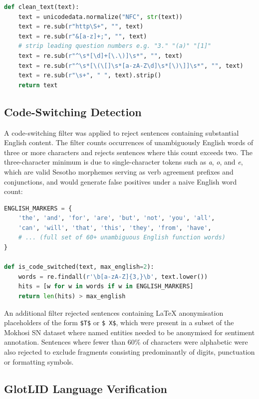 \documentclass[12pt]{ThesisRU}
\begin{document}
\begin{lstlisting}[language=Python, caption={Text cleaning function.}, label={lst:clean}]
def clean_text(text):
    text = unicodedata.normalize("NFC", str(text))
    text = re.sub(r"http\S+", "", text)
    text = re.sub(r"&[a-z]+;", "", text)
    # strip leading question numbers e.g. "3." "(a)" "[1]"
    text = re.sub(r"^\s*[\d]+[\.\)]\s*", "", text)
    text = re.sub(r"^\s*[\(\[]\s*[a-zA-Z\d]\s*[\)\]]\s*", "", text)
    text = re.sub(r"\s+", " ", text).strip()
    return text
\end{lstlisting}

\subsection{Code-Switching Detection}

A code-switching filter was applied to reject sentences containing substantial English content. The filter counts occurrences of unambiguously English words of three or more characters and rejects sentences where this count exceeds two. The three-character minimum is due to single-character tokens such as \textit{a}, \textit{o}, and \textit{e}, which are valid Sesotho morphemes serving as verb agreement prefixes and conjunctions, and would generate false positives under a naive English word count:

\begin{lstlisting}[language=Python, caption={Code-switching detection function.}, label={lst:codeswitching}]
ENGLISH_MARKERS = {
    'the', 'and', 'for', 'are', 'but', 'not', 'you', 'all',
    'can', 'will', 'that', 'this', 'they', 'from', 'have',
    # ... (full set of 60+ unambiguous English function words)
}
 
def is_code_switched(text, max_english=2):
    words = re.findall(r'\b[a-zA-Z]{3,}\b', text.lower())
    hits = [w for w in words if w in ENGLISH_MARKERS]
    return len(hits) > max_english
\end{lstlisting}

An additional filter rejected sentences containing LaTeX anonymisation placeholders of the form \texttt{\$T\$} or \texttt{\$ X\$}, which were present in a subset of the Mokhosi SN dataset where named entities needed to be anonymised for sentiment annotation. Sentences where fewer than 60\% of characters were alphabetic were also rejected to exclude fragments consisting predominantly of digits, punctuation or formatting symbols.


\subsection{GlotLID Language Verification}
\end{document}
